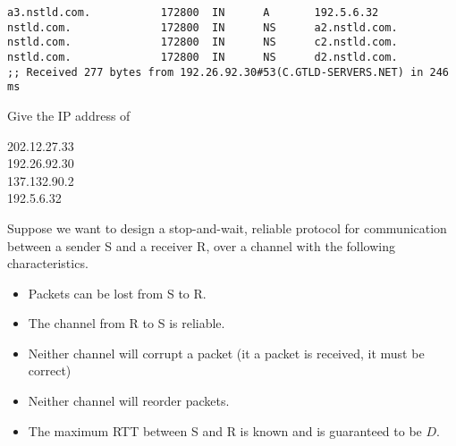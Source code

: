 \documentclass[a4paper,11pt,answers]{exam}
\begin{document}
\begin{questions}
\begin{verbatim}
a3.nstld.com.           172800  IN      A       192.5.6.32
nstld.com.              172800  IN      NS      a2.nstld.com.
nstld.com.              172800  IN      NS      c2.nstld.com.
nstld.com.              172800  IN      NS      d2.nstld.com.
;; Received 277 bytes from 192.26.92.30#53(C.GTLD-SERVERS.NET) in 246 ms
\end{verbatim}
	
Give the IP address of

\begin{solution}
202.12.27.33\\
192.26.92.30\\
137.132.90.2\\
192.5.6.32
\end{solution}

\question
Suppose we want to design a stop-and-wait, reliable protocol for communication 
between a sender S and a receiver R, over a channel with the following 
characteristics.
\begin{itemize}
	\item Packets can be lost from S to R.
	\item The channel from R to S is reliable.
	\item Neither channel will corrupt a packet (it a packet is received, it
	      must be correct)
	\item Neither channel will reorder packets.
	\item The maximum RTT between S and R is known and is guaranteed to be $D$.
	\end{itemize}


\end{questions}
\end{document}
